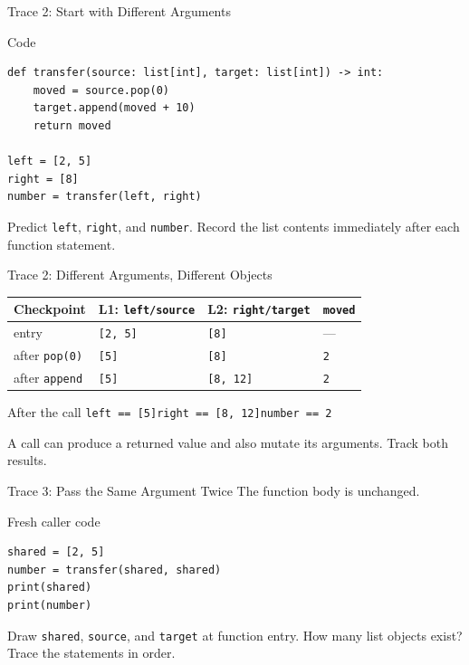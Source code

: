 \documentclass[aspectratio=169,10pt]{beamer}
\begin{document}

\begin{frame}[fragile]{Trace 2: Start with Different Arguments}
  \begin{block}{Code}
\begin{verbatim}
def transfer(source: list[int], target: list[int]) -> int:
    moved = source.pop(0)
    target.append(moved + 10)
    return moved

left = [2, 5]
right = [8]
number = transfer(left, right)
\end{verbatim}
  \end{block}
  \begin{activity}
    Predict \texttt{left}, \texttt{right}, and \texttt{number}. Record the list contents immediately after each function statement.
  \end{activity}
\end{frame}

\begin{frame}{Trace 2: Different Arguments, Different Objects}
  \begin{center}
    \renewcommand{\arraystretch}{1.4}
    \begin{tabular}{l|l|l|l}
      \textbf{Checkpoint} & \textbf{L1: \texttt{left/source}} & \textbf{L2: \texttt{right/target}} & \texttt{moved} \\\hline
      entry & \texttt{[2, 5]} & \texttt{[8]} & --- \\
      after \texttt{pop(0)} & \texttt{[5]} & \texttt{[8]} & \texttt{2} \\
      after \texttt{append} & \texttt{[5]} & \texttt{[8, 12]} & \texttt{2}
    \end{tabular}
  \end{center}
  \begin{block}{After the call}
    \texttt{left == [5]}\qquad \texttt{right == [8, 12]}\qquad \texttt{number == 2}
  \end{block}
  \begin{keyidea}
    A call can produce a returned value and also mutate its arguments. Track both results.
  \end{keyidea}
\end{frame}

\begin{frame}[fragile]{Trace 3: Pass the Same Argument Twice}
  The function body is unchanged.
  \begin{block}{Fresh caller code}
\begin{verbatim}
shared = [2, 5]
number = transfer(shared, shared)
print(shared)
print(number)
\end{verbatim}
  \end{block}
  \begin{activity}
    Draw \texttt{shared}, \texttt{source}, and \texttt{target} at function entry. How many list objects exist? Trace the statements in order.
  \end{activity}
\end{frame}
\end{document}

